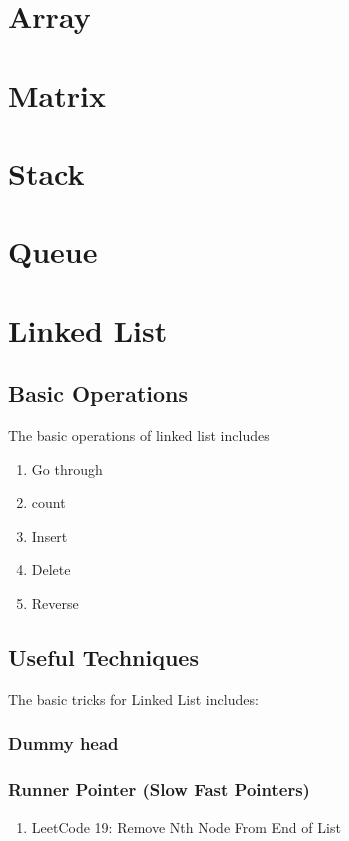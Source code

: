 \chapter{ Array }

\chapter{ Matrix }

\chapter{ Stack }

\chapter{ Queue }

\chapter{ Linked List }

\section{ Basic Operations  }
The basic operations of linked list includes 
\begin{enumerate}
    \item Go through
    
    \item count

    \item Insert

    \item Delete
    
    \item Reverse

\end{enumerate}

\section{ Useful Techniques  }
The basic tricks for Linked List includes:
 
\subsection { Dummy head }


\subsection { Runner Pointer (Slow Fast Pointers)}
\begin{enumerate}
    \item LeetCode 19: Remove Nth Node From End of List


\end{enumerate}
   



